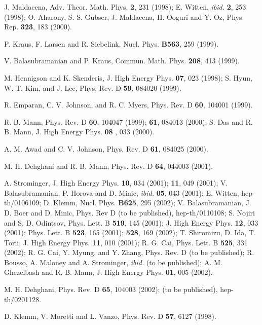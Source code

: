 \documentclass[a4paper,12pt,onecolumn]{revtex4}
\begin{document}
\begin{thebibliography}{99}

  J. Maldacena, Adv. Theor. Math. Phys. \textbf{2}, 231
(1998); E. Witten, \emph{ibid.} \textbf{2}, 253 (1998); O.
Aharony, S. S. Gubser, J. Maldacena, H. Ooguri and Y. Oz, Phys.
Rep. \textbf{323}, 183 (2000).

  P. Kraus, F. Larsen and R. Siebelink, Nucl. Phys. \textbf{%
B563}, 259 (1999).

  V. Balasubramanian and P. Kraus, Commun. Math. Phys. \textbf{%
208}, 413 (1999).

  M. Hennigson and K. Skenderis, J. High Energy Phys. \textbf{07}, 023
(1998); S. Hyun, W. T. Kim, and J. Lee, Phys. Rev. D \textbf{59},
084020 (1999).

  R. Emparan, C. V. Johnson, and R. C. Myers, Phys. Rev. D
\textbf{60}, 104001 (1999).

  R. B. Mann, Phys. Rev. D \textbf{60}, 104047 (1999);
\textbf{61}, 084013 (2000); S. Das and R. B. Mann, J. High Energy Phys. \textbf{08}%
, 033 (2000).

  A. M. Awad and C. V. Johnson, Phys. Rev. D \textbf{61},
084025 (2000).

  M. H. Dehghani and R. B. Mann, Phys. Rev. D \textbf{64},
044003 (2001).

  A. Strominger, J. High Energy Phys. \textbf{10}, 034 (2001); \textbf{11}, 049 (2001);
V. Balasubramanian, P. Horova and D. Minic, \emph{ibid.}
\textbf{05}, 043 (2001); E. Witten, hep-th/0106109; D. Klemm,
Nucl. Phys. \textbf{B625}, 295 (2002); V. Balasubramanian, J. D.
Boer and D. Minic, Phys. Rev D (to be published), hep-th/0110108;
S. Nojiri and S. D. Odintsov, Phys. Lett. B \textbf{519}, 145
(2001); J. High Energy Phys. \textbf{12}, 033 (2001); Phys. Lett.
B \textbf{523}, 165 (2001); \textbf{528}, 169 (2002); T.
Shiromizu, D. Ida, T. Torii, J. High Energy Phys. \textbf{11}, 010
(2001); R. G. Cai, Phys. Lett. B \textbf{525}, 331 (2002); R. G.
Cai, Y. Myung, and Y. Zhang, Phys. Rev. D (to be published); R.
Bousso, A. Maloney and A. Strominger, \emph{ibid.} (to be
published); A. M. Ghezelbash and R. B. Mann, J. High Energy Phys.
\textbf{01}, 005 (2002).

  M. H. Dehghani, Phys. Rev. D \textbf{65}, 104003 (2002);
(to be published), hep-th/0201128.

  D. Klemm, V. Moretti and L. Vanzo, Phys. Rev. D \textbf{57},
6127 (1998).


\end{thebibliography}
\end{document}
